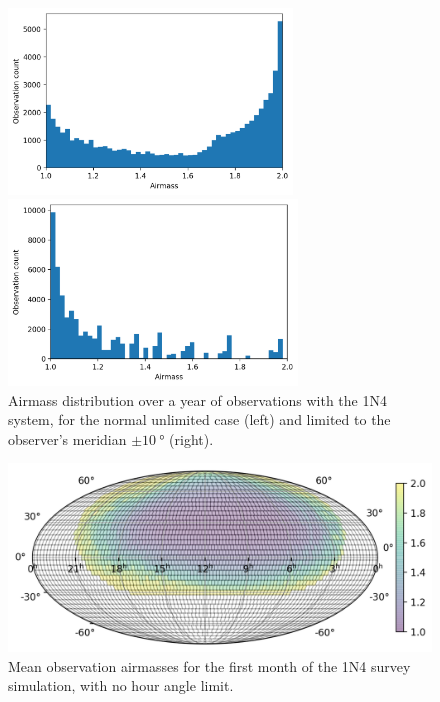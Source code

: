 \begin{colsection}
\begin{colsection}
\begin{figure}[p]
    \begin{center}
        \begin{minipage}[t]{0.49\textwidth}\vspace{10pt}
            \includegraphics[height=140pt]{images/survey_sims/365_1N4_lite_airmass3.png}
        \end{minipage}
        \begin{minipage}[t]{0.49\textwidth}\vspace{10pt}
            \includegraphics[height=140pt]{images/survey_sims/365_1N4_meridian_airmass3.png}
        \end{minipage}
    \end{center}
    \caption[Airmass distribution over a year of observations]{
        Airmass distribution over a year of observations with the 1N4 system, for the normal unlimited case (left) and limited to the observer's meridian $\pm\SI{10}{\degree}$ (right).
    }\label{fig:survey_sim_airmass_365}
\end{figure}

\begin{figure}[p]
    \begin{center}
        \includegraphics[width=0.7\linewidth]{images/survey_sims/30_1N4_lite_airmass.png}
    \end{center}
    \caption[Mean observation airmasses for the 1N4 survey simulation]{
        Mean observation airmasses for the first month of the 1N4 survey simulation, with no hour angle limit.
    }\label{fig:survey_sim_airmass_normal}
\end{figure}


\end{colsection}
\end{colsection}
